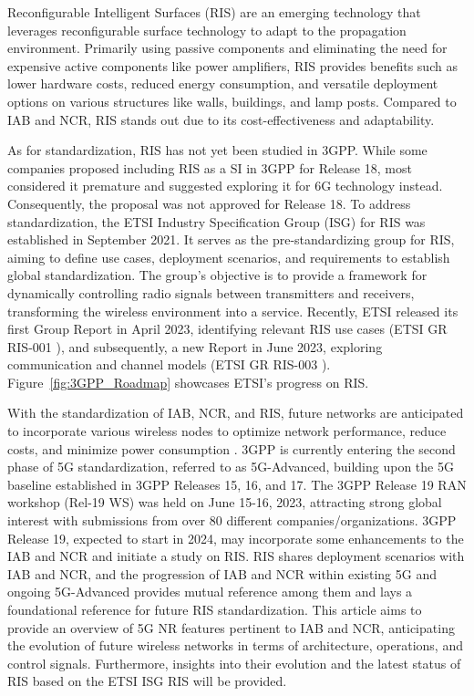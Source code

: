 \documentclass[lettersize,journal]{IEEEtran}
\begin{document}
Reconfigurable Intelligent Surfaces (RIS) are an emerging technology that leverages reconfigurable surface technology to adapt to the propagation environment. Primarily using passive components and eliminating the need for expensive active components like power amplifiers, RIS provides benefits such as lower hardware costs, reduced energy consumption, and versatile deployment options on various structures like walls, buildings, and lamp posts. Compared to IAB and NCR, RIS stands out due to its cost-effectiveness and adaptability.

As for standardization, RIS has not yet been studied in 3GPP. While some companies proposed including RIS as a SI in 3GPP for Release 18, most considered it premature and suggested exploring it for 6G technology instead. Consequently, the proposal was not approved for Release 18. To address standardization, the ETSI Industry Specification Group (ISG) for RIS was established in September 2021. It serves as the pre-standardizing group for RIS, aiming to define use cases, deployment scenarios, and requirements to establish global standardization. The group's objective is to provide a framework for dynamically controlling radio signals between transmitters and receivers, transforming the wireless environment into a service. Recently, ETSI released its first Group Report in April 2023, identifying relevant RIS use cases (ETSI GR RIS-001 \cite{ETSI-GR-RIS-001}), and subsequently, a new Report in June 2023, exploring communication and channel models (ETSI GR RIS-003 \cite{ETSI-GR-RIS-003}). Figure~\ref{fig:3GPP_Roadmap} showcases ETSI's progress on RIS.

With the standardization of IAB, NCR, and RIS, future networks are anticipated to incorporate various wireless nodes to optimize network performance, reduce costs, and minimize power consumption \cite{Flamini-TAP22}. 3GPP is currently entering the second phase of 5G standardization, referred to as 5G-Advanced, building upon the 5G baseline established in 3GPP Releases 15, 16, and 17. The 3GPP Release 19 RAN workshop (Rel-19 WS) was held on June 15-16, 2023, attracting strong global interest with submissions from over 80 different companies/organizations. 3GPP Release 19, expected to start in 2024, may incorporate some enhancements to the IAB and NCR and initiate a study on RIS. RIS shares deployment scenarios with IAB and NCR, and the progression of IAB and NCR within existing 5G and ongoing 5G-Advanced provides mutual reference among them and lays a foundational reference for future RIS standardization. This article aims to provide an overview of 5G NR features pertinent to IAB and NCR, anticipating the evolution of future wireless networks in terms of architecture, operations, and control signals. Furthermore, insights into their evolution and the latest status of RIS based on the ETSI ISG RIS will be provided.
\end{document}
